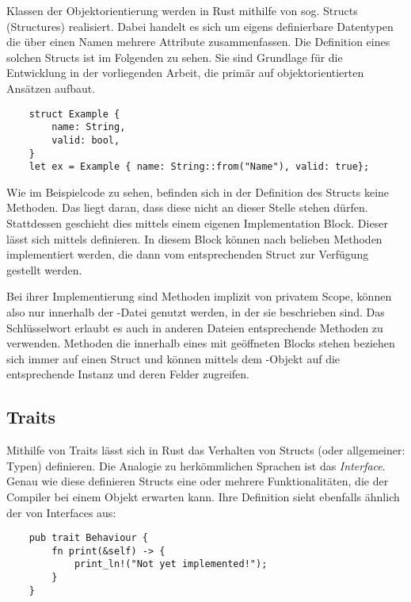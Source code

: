 Klassen der Objektorientierung werden in Rust mithilfe von sog. \glqq Structs\grqq{} (Structures) realisiert. Dabei handelt es sich um eigens definierbare Datentypen die über einen Namen mehrere Attribute zusammenfassen. Die Definition eines solchen Structs ist im Folgenden zu sehen. Sie sind Grundlage für die Entwicklung in der vorliegenden Arbeit, die primär auf objektorientierten Ansätzen aufbaut.

\begin{verbatim}
    struct Example {
        name: String,
	    valid: bool,
    }
    let ex = Example { name: String::from("Name"), valid: true};
\end{verbatim}


Wie im Beispielcode zu sehen, befinden sich in der Definition des Structs  keine Methoden. Das liegt daran, dass diese nicht an dieser Stelle stehen dürfen. Stattdessen geschieht dies mittels einem eigenen \glqq Implementation Block\grqq. Dieser lässt sich mittels  definieren. In diesem Block können nach belieben Methoden implementiert werden, die dann vom entsprechenden Struct zur Verfügung gestellt werden. 

Bei ihrer Implementierung sind Methoden implizit von privatem Scope, können also nur innerhalb der -Datei genutzt werden, in der sie beschrieben sind. Das Schlüsselwort  erlaubt es auch in anderen Dateien entsprechende Methoden zu verwenden. Methoden die innerhalb eines mit  geöffneten Blocks stehen beziehen sich immer auf einen Struct und können mittels dem -Objekt auf die entsprechende Instanz und deren Felder zugreifen.

\subsection{Traits}

Mithilfe von Traits lässt sich in Rust das Verhalten von Structs (oder allgemeiner: Typen) definieren. Die Analogie zu herkömmlichen Sprachen ist das \textit{Interface}. Genau wie diese definieren Structs eine oder mehrere Funktionalitäten, die der Compiler bei einem Objekt erwarten kann. Ihre Definition sieht ebenfalls ähnlich der von Interfaces aus:

\begin{verbatim}
    pub trait Behaviour {
        fn print(&self) -> {
            print_ln!("Not yet implemented!");
        }
    }
\end{verbatim}


